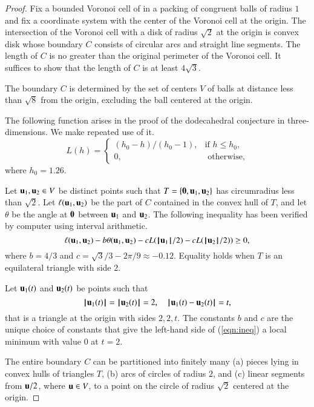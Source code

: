 \documentclass{llncs}
\begin{document}
\begin{proof} Fix a bounded Voronoi cell of in a packing of congruent
  balls of radius $1$ and fix a coordinate system with the center of
  the Voronoi cell at the origin.  The intersection of the Voronoi
  cell with a disk of radius $\sqrt2$ at the origin is convex disk
  whose boundary $C$ consists of circular arcs and straight line
  segments.  The length of $C$ is no greater than the original
  perimeter of the Voronoi cell.  It suffices to show that the length
  of $C$ is at least $4\sqrt{3}$.



The boundary $C$ is determined by the set of centers $V$ of balls at
distance less than $\sqrt8$ from the origin, excluding the ball
centered at the origin.

The following function arises in the proof of the dodecahedral
conjecture in three-dimensions.  We make repeated use of it.
\begin{equation}
L(h) = \begin{cases} 
   (h_0-h)/(h_0-1),& \text{if } h \le h_0,\\
  0,&\text{ otherwise},
 \end{cases}
\end{equation}
where $h_0 = 1.26$. 

Let ${\mathbf u}_1,{\mathbf u}_2\in V$ be distinct points such that
$T=\{{\mathbf 0},{\mathbf u}_1,{\mathbf u}_2\}$ has circumradius less than $\sqrt2$.  Let
$\ell({\mathbf u}_1,{\mathbf u}_2)$ be the part of $C$ contained in the convex hull of
$T$, and let $\theta$ be the angle at ${\mathbf 0}$ between ${\mathbf u}_1$ and
${\mathbf u}_2$. 
The following inequality has been verified by computer using interval
arithmetic.
\begin{equation}\label{eqn:ineq}
\ell({\mathbf u}_1,{\mathbf u}_2) - b \theta({\mathbf u}_1,{\mathbf u}_2) - c L({{\hskip0.1em|\hskip-0.15em|\hskip0.1em}{\mathbf u}_1{\hskip0.1em|\hskip-0.15em|\hskip0.1em}}/2) - c L({{\hskip0.1em|\hskip-0.15em|\hskip0.1em}{\mathbf u}_2{\hskip0.1em|\hskip-0.15em|\hskip0.1em}}/2)) \ge 0,
\end{equation}
where $b=4/3$ and $c=\sqrt3/3 - 2\pi/9 \approx -0.12$.
Equality holds when $T$ is an equilateral triangle with side $2$.

\begin{remark}
Let ${\mathbf u}_1(t)$ and ${\mathbf u}_2(t)$ be points such  that
\[
\normo{\u_1(t)}=\normo{\u_2(t)}=2,\quad \norm{\u_1(t)}{\u_2(t)}=t,
\]
that is a triangle at the origin with sides $2,2,t$.   The constants $b$ and $c$ are the unique choice
of constants that give the left-hand side of (\ref{eqn:ineq}) a local minimum with value
$0$ at $t=2$.
\end{remark}

The entire boundary $C$ can be partitioned into finitely many (a) pieces lying in convex hulls
of triangles $T$,  (b) arcs of circles of radius $2$, and (c)  linear segments
 from ${\mathbf u}/2$, where ${\mathbf u}\in V$, to a point on the circle of radius $\sqrt2$ centered at the origin.


\end{proof}
\end{document}
